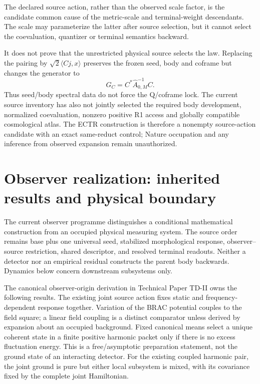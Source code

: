 \documentclass[11pt,a4paper]{article}
\theoremstyle{remark}
\begin{document}
The declared source action, rather than the observed scale factor, is the
candidate common cause of the metric-scale and terminal-weight descendants.
The scale may parameterize the latter after source selection, but it cannot
select the coevaluation, quantizer or terminal semantics backward.

It does not prove that the unrestricted physical source selects the law.
Replacing the pairing by $\sqrt2\langle Cj,x\rangle$ preserves the frozen
seed, body and coframe but changes the generator to
\begin{equation}
 G_C=C^*\widehat A_{0,M}^{-1}C.
 \label{eq:td0-ectr-control}
\end{equation}
Thus seed/body spectral data do not force the Q/coframe lock. The current
source inventory has also not jointly selected the required body development,
normalized coevaluation, nonzero positive R1 access and globally compatible
cosmological atlas. The ECTR construction is therefore a nonempty
source-action candidate with an exact same-reduct control; Nature occupation
and any inference from observed expansion remain unauthorized.

\section{Observer realization: inherited results and physical boundary}
\label{sec:observer-update-20260914}
The current observer programme distinguishes a conditional mathematical
construction from an occupied physical measuring system. The source order
remains base plus one universal seed, stabilized morphological response,
observer--source restriction, shared descriptor, and resolved terminal
readouts. Neither a detector nor an empirical residual constructs the parent
body backwards. Dynamics below concern downstream subsystems only.

The canonical observer-origin derivation in Technical Paper TD-II owns the following
results. The existing joint source action fixes static and frequency-dependent
response together. Variation of the BRAC potential couples to the field
square; a linear field coupling is a distinct comparator unless derived by
expansion about an occupied background. Fixed canonical means select a unique
coherent state in a finite positive harmonic packet only if there is no excess
fluctuation energy. This is a free/asymptotic preparation statement, not the
ground state of an interacting detector. For the existing coupled harmonic
pair, the joint ground is pure but either local subsystem is mixed, with its
covariance fixed by the complete joint Hamiltonian.
\end{document}
